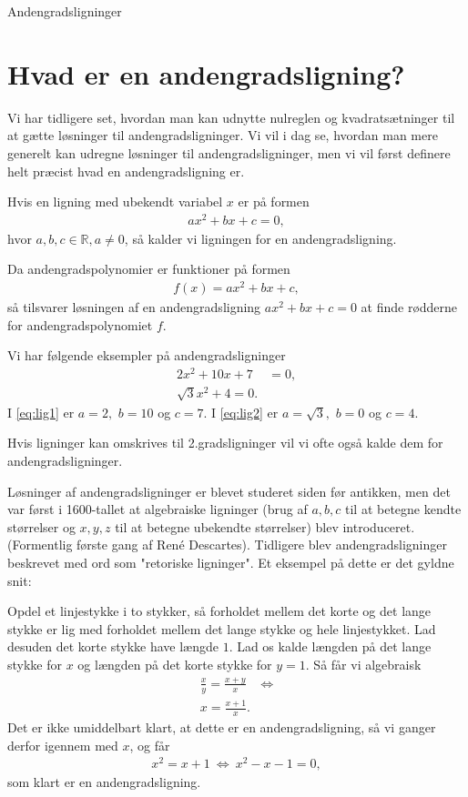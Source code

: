 \begin{center}
\Huge
Andengradsligninger
\end{center}

\section*{Hvad er en andengradsligning?}

Vi har tidligere set, hvordan man kan udnytte nulreglen og kvadratsætninger til at gætte løsninger til andengradsligninger. Vi vil i dag se, hvordan man mere generelt kan udregne løsninger til andengradsligninger, men vi vil først definere helt præcist hvad en andengradsligning er.
\begin{defn}[andengradsligning]
Hvis en ligning med ubekendt variabel $x$ er på formen 
\begin{align*}
ax^2+bx+c=0,
\end{align*}
hvor $a,b,c\in \mathbb{R}, a\neq 0$, så kalder vi ligningen for en andengradsligning. 
\end{defn}
Da andengradspolynomier er funktioner på formen 
\begin{align*}
f(x) = ax^2+bx+c, 
\end{align*}
så tilsvarer løsningen af en andengradsligning $ax^2+bx+c= 0$ at finde rødderne for andengradspolynomiet $f$.  

\begin{exa}
Vi har følgende eksempler på andengradsligninger
\begin{align}
2x^2+10x+7&=0\label{eq:lig1},\\
\sqrt{3}x^2+4=0\label{eq:lig2}.
\end{align}
I \eqref{eq:lig1} er $a=2,$ $b=10$ og $c=7$. I \eqref{eq:lig2} er $a=\sqrt{3},$ $b=0$ og $c=4$. 
\end{exa}
Hvis ligninger kan omskrives til 2.gradsligninger vil vi ofte også kalde dem for andengradsligninger.
\begin{exa}
Løsninger af andengradsligninger er blevet studeret siden før antikken, men det var først i 1600-tallet at algebraiske ligninger (brug af $a,b,c$ til at betegne kendte størrelser og $x,y,z$ til at betegne ubekendte størrelser) blev introduceret. (Formentlig første gang af René Descartes). Tidligere blev andengradsligninger beskrevet med ord som "retoriske ligninger". Et eksempel på dette er det gyldne snit:

Opdel et linjestykke i to stykker, så forholdet mellem det korte og det lange stykke er lig med forholdet mellem det lange stykke og hele linjestykket. Lad desuden det korte stykke have længde $1$. Lad os kalde længden på det lange stykke for $x$ og længden på det korte stykke for $y=1$. Så får vi algebraisk
\begin{align*}
 \frac{x}{y} = \frac{x+y}{x} &\Leftrightarrow\\
 x = \frac{x+1}{x}.
\end{align*}
Det er ikke umiddelbart klart, at dette er en andengradsligning, så vi ganger derfor igennem med $x$, og får
\begin{align*}
x^2 = x+1\  \Leftrightarrow\ x^2-x-1=0,
\end{align*}
som klart er en andengradsligning.
\end{exa}
